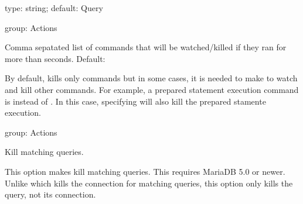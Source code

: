 \documentclass[letterpaper,10pt,english]{sphinxmanual}
\begin{document}
\begin{fulllineitems}
\label{\detokenize{mariadb-kill:cmdoption-mariadb-kill-kill-busy-commands}}
\sphinxAtStartPar
type: string; default: Query

\sphinxAtStartPar
group: Actions

\sphinxAtStartPar
Comma sepatated list of commands that will be watched/killed if they ran for
more than {\hyperref[\detokenize{mariadb-kill:cmdoption-mariadb-kill-busy-time}]{}} seconds. Default: 

\sphinxAtStartPar
By default, {\hyperref[\detokenize{mariadb-kill:cmdoption-mariadb-kill-busy-time}]{}} kills only  commands but in some cases, it
is needed to make {\hyperref[\detokenize{mariadb-kill:cmdoption-mariadb-kill-busy-time}]{}} to watch and kill other commands. For example,
a prepared statement execution command is  instead of . In this
case, specifying  will also kill the prepared
stamente execution.

\end{fulllineitems}


\begin{fulllineitems}
\label{\detokenize{mariadb-kill:cmdoption-mariadb-kill-kill-query}}
\sphinxAtStartPar
group: Actions

\sphinxAtStartPar
Kill matching queries.

\sphinxAtStartPar
This option makes  kill matching queries.  This requires MariaDB 5.0 or
newer.  Unlike {\hyperref[\detokenize{mariadb-kill:cmdoption-mariadb-kill-kill}]{}} which kills the connection for matching queries,
this option only kills the query, not its connection.

\end{fulllineitems}
\end{document}
